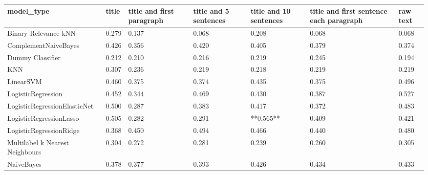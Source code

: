 \begin{tabular}{lllllll}
\toprule
                     model\_type & title & title and first paragraph & title and 5 sentences & title and 10 sentences & title and first sentence each paragraph & raw text \\
\midrule
           Binary Relevance kNN & 0.279 &                     0.137 &                 0.068 &                  0.208 &                                   0.068 &    0.068 \\
           ComplementNaiveBayes & 0.426 &                     0.356 &                 0.420 &                  0.405 &                                   0.379 &    0.374 \\
               Dummy Classifier & 0.212 &                     0.210 &                 0.216 &                  0.219 &                                   0.245 &    0.194 \\
                            KNN & 0.307 &                     0.236 &                 0.219 &                  0.218 &                                   0.219 &    0.219 \\
                      LinearSVM & 0.460 &                     0.375 &                 0.374 &                  0.435 &                                   0.375 &    0.496 \\
             LogisticRegression & 0.452 &                     0.344 &                 0.469 &                  0.430 &                                   0.387 &    0.527 \\
   LogisticRegressionElasticNet & 0.500 &                     0.287 &                 0.383 &                  0.417 &                                   0.372 &    0.483 \\
        LogisticRegressionLasso & 0.505 &                     0.282 &                 0.291 &              **0.565** &                                   0.409 &    0.421 \\
        LogisticRegressionRidge & 0.368 &                     0.450 &                 0.494 &                  0.466 &                                   0.440 &    0.480 \\
Multilabel k Nearest Neighbours & 0.304 &                     0.272 &                 0.281 &                  0.239 &                                   0.260 &    0.305 \\
                     NaiveBayes & 0.378 &                     0.377 &                 0.393 &                  0.426 &                                   0.434 &    0.433 \\

\end{tabular}
